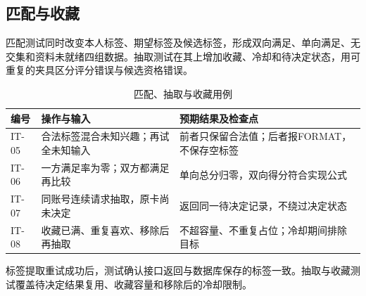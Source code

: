 \subsection*{匹配与收藏}
匹配测试同时改变本人标签、期望标签及候选标签，形成双向满足、单向满足、无交集和资料未就绪四组数据。抽取测试在其上增加收藏、冷却和待决定状态，用可重复的夹具区分评分错误与候选资格错误。

\begin{table}[H]\centering\small
\caption{匹配、抽取与收藏用例}
\begin{tabularx}{\linewidth}{@{}p{15mm}p{38mm}X@{}}\toprule
编号 & 操作与输入 & 预期结果及检查点 \\ \midrule
IT-05 & 合法标签混合未知兴趣；再试全未知输入 & 前者只保留合法值；后者报FORMAT，不保存空标签 \\
IT-06 & 一方满足率为零；双方都满足再比较 & 单向总分归零，双向得分符合实现公式 \\
IT-07 & 同账号连续请求抽取，原卡尚未决定 & 返回同一待决定记录，不绕过决定状态 \\
IT-08 & 收藏已满、重复喜欢、移除后再抽取 & 不超容量、不重复占位；冷却期间排除目标 \\ \bottomrule
\end{tabularx}\end{table}

标签提取重试成功后，测试确认接口返回与数据库保存的标签一致。抽取与收藏测试覆盖待决定结果复用、收藏容量和移除后的冷却限制。

